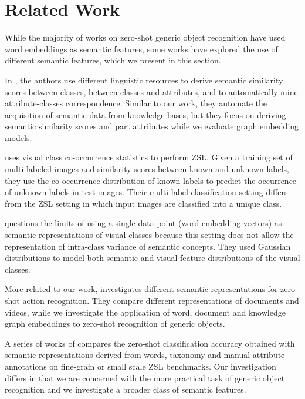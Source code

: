 \section{Related Work}

While the majority of works on zero-shot generic object recognition have used word embeddings as semantic features, some works have explored the use of different semantic features, which we present in this section. 

In \cite{rohrbach2010helps}, the authors use different linguistic resources to derive semantic similarity scores between classes, between classes and attributes, and to automatically mine attribute-classes correspondence. Similar to our work, they automate the acquisition of semantic data from knowledge bases, but they focus on deriving semantic similarity scores and part attributes while we evaluate graph embedding models. 

\cite{mensink2014costa} uses visual class co-occurrence statistics to perform ZSL. Given a training set of multi-labeled images and similarity scores between known and unknown labels, they use the co-occurrence distribution of known labels to predict the occurrence of unknown labels in test images. Their multi-label classification setting differs from the ZSL setting in which input images are classified into a unique class. 

\cite{mukherjee2016gaussian} questions the limits of using a single data point (word embedding vectors) as semantic representations of visual classes because this setting does not allow the representation of intra-class variance of semantic concepts. They used Gaussian distributions to model both semantic and visual feature distributions of the visual classes. 

More related to our work, \cite{wang2017alternative} investigates different semantic representations for zero-shot action recognition. They compare different representations of documents and videos, while we investigate the application of word, document and knowledge graph embeddings to zero-shot recognition of generic objects.

A series of works of \cite{akata2015evaluation,xian2016latent,akata2016label} compares the zero-shot classification accuracy obtained with semantic representations derived from words, taxonomy and manual attribute annotations on fine-grain or small scale ZSL benchmarks. Our investigation differs in that we are concerned with the more practical task of generic object recognition and we investigate a broader class of semantic features. 

